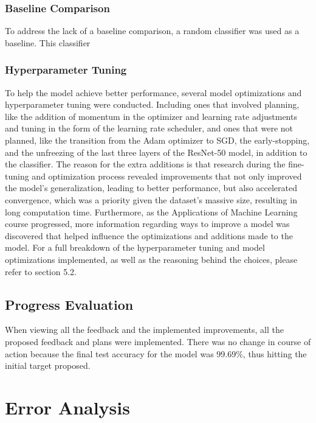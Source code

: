 \documentclass[11pt]{article}
\begin{document}
\subsubsection{Baseline Comparison}

To address the lack of a baseline comparison, a random classifier was used as a baseline. This classifier

\subsubsection{Hyperparameter Tuning}

To help the model achieve better performance, several model optimizations and hyperparameter tuning were conducted. Including ones that involved planning, like the addition of momentum in the optimizer and learning rate adjustments and tuning in the form of the learning rate scheduler, and ones that were not planned, like the transition from the Adam optimizer to SGD, the early-stopping, and the unfreezing of the last three layers of the ResNet-50 model, in addition to the classifier. The reason for the extra additions is that research during the fine-tuning and optimization process revealed improvements that not only improved the model's generalization, leading to better performance, but also accelerated convergence, which was a priority given the dataset's massive size, resulting in long computation time. Furthermore, as the Applications of Machine Learning course progressed, more information regarding ways to improve a model was discovered that helped influence the optimizations and additions made to the model. For a full breakdown of the hyperparameter tuning and model optimizations implemented, as well as the reasoning behind the choices, please refer to section 5.2.

\subsection{Progress Evaluation}

When viewing all the feedback and the implemented improvements, all the proposed feedback and plans were implemented. There was no change in course of action because the final test accuracy for the model was 99.69\%, thus hitting the initial target proposed.


\section{Error Analysis}
\end{document}

